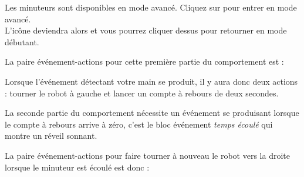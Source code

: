{Les minuteurs sont disponibles en mode avancé.
Cliquez sur  pour entrer en mode avancé.\\
L'icône deviendra alors  et vous pourrez cliquer dessus pour retourner en mode débutant.}

La paire événement-actions pour cette première partie du comportement est : 

Lorsque l'événement détectant votre main se produit, il y aura donc deux actions : tourner le robot à gauche et lancer un compte à rebours de deux secondes.

La seconde partie du comportement nécessite un événement se produisant lorsque le compte à rebours arrive à zéro, c'est le bloc événement \emph{temps écoulé}  qui montre un réveil sonnant.

La paire événement-actions pour faire tourner à nouveau le robot vers la droite lorsque le minuteur est écoulé est donc : 

\bigskip


